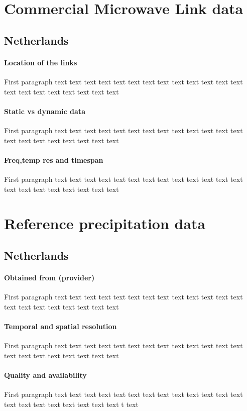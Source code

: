 \documentclass[twocolumn, 10pt, a4paper]{memoir}
\begin{document}
	\section{Commercial Microwave Link data}
	\subsection{Netherlands}
	\paragraph{Location of the links}
	First paragraph
	text text text text text text text text text text text text text text text text text text text text text
	\paragraph{Static vs dynamic data}
	First paragraph
	text text text text text text text text text text text text text text text text text text text text text
	\paragraph{Freq,temp res and timespan}
	First paragraph
	text text text text text text text text text text text text text text text text text text text text text
	
	\section{Reference precipitation data}
	\subsection{Netherlands}
	\paragraph{Obtained from (provider)}
	First paragraph
	text text text text text text text text text text text text text text text text text text text text text
	\paragraph{Temporal and spatial resolution}
	First paragraph
	text text text text text text text text text text text text text text text text text text text text text
	\paragraph{Quality and availability}
	First paragraph
	text text text text text text text text text text text text text text text text text text text text text
	t text
	
\end{document}
